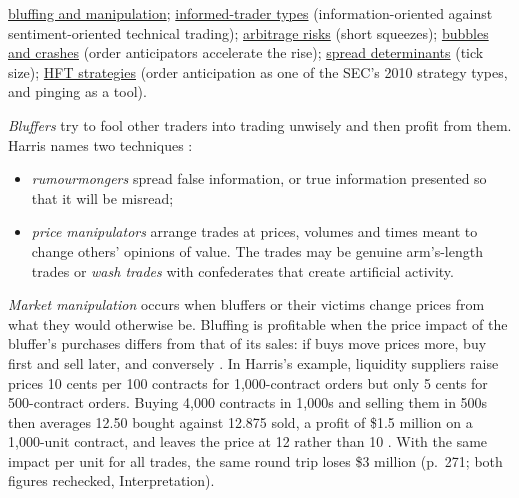 \begin{qfdefinition}
 \hyperref[def:bluffing-manipulation]{bluffing and manipulation}; \hyperref[def:informed-trader-types]{informed-trader types} (information-oriented against sentiment-oriented technical trading); \hyperref[res:arbitrage-risks]{arbitrage risks} (short squeezes); \hyperref[mech:bubble-crash-dynamics]{bubbles and crashes} (order anticipators accelerate the rise); \hyperref[res:spread-determinants]{spread determinants} (tick size); \hyperref[def:hft-strategies]{HFT strategies} (order anticipation as one of the SEC's 2010 strategy types, and pinging as a tool).

\end{qfdefinition}

\begin{qfdefinition}\label{def:bluffing-manipulation}
 \emph{Bluffers} try to fool other traders into trading unwisely and then profit from them. Harris names two techniques \citep[chap.~``Bluffers and Market Manipulation'', p.~259 and Table~12-3, p.~274]{alpha-harris}:
\begin{itemize}
\item \emph{rumourmongers} spread false information, or true information presented so that it will be misread;
\item \emph{price manipulators} arrange trades at prices, volumes and times meant to change others' opinions of value. The trades may be genuine arm's-length trades or \emph{wash trades} with confederates that create artificial activity.
\end{itemize}
\emph{Market manipulation} occurs when bluffers or their victims change prices from what they would otherwise be. Bluffing is profitable when the price impact of the bluffer's purchases differs from that of its sales: if buys move prices more, buy first and sell later, and conversely \citep[same chap., sec.~12.3, pp.~270--273]{alpha-harris}. In Harris's example, liquidity suppliers raise prices 10 cents per 100 contracts for 1{,}000-contract orders but only 5 cents for 500-contract orders. Buying 4{,}000 contracts in 1{,}000s and selling them in 500s then averages 12.50 bought against 12.875 sold, a profit of \$1.5 million on a 1{,}000-unit contract, and leaves the price at 12 rather than 10 \citep[same sec., p.~270]{alpha-harris}. With the same impact per unit for all trades, the same round trip loses \$3 million (p.~271; both figures rechecked, Interpretation).


\end{qfdefinition}
